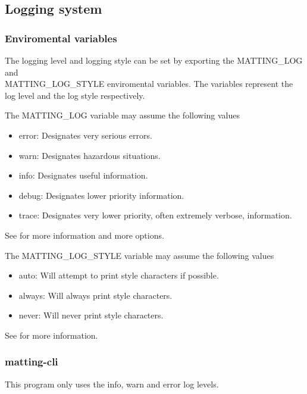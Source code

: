 \documentclass[a4paper]{article}
\begin{document}
\subsection{Logging system}

\subsubsection{Enviromental variables}

The logging level and logging style can be set
by exporting the \colorbox{gray!10}{MATTING\_LOG} and \\
\colorbox{gray!10}{MATTING\_LOG\_STYLE}
enviromental variables. The variables represent the log level
and the log style respectively.

The \colorbox{gray!10}{MATTING\_LOG} variable may assume the following values
\begin{itemize}
    \item \colorbox{gray!10}{error}: Designates very serious errors.
    \item \colorbox{gray!10}{warn}: Designates hazardous situations.
    \item \colorbox{gray!10}{info}: Designates useful information.
    \item \colorbox{gray!10}{debug}: Designates lower priority information.
    \item \colorbox{gray!10}{trace}: Designates very lower priority, often extremely verbose, information.
\end{itemize}
See \cite{envlogginglvl} for more information and more options.

The \colorbox{gray!10}{MATTING\_LOG\_STYLE} variable may assume the following values
\begin{itemize}
    \item \colorbox{gray!10}{auto}: Will attempt to print style characters if possible.
    \item \colorbox{gray!10}{always}: Will always print style characters.
    \item \colorbox{gray!10}{never}: Will never print style characters.
\end{itemize}
See \cite{envloggingstyle} for more information.

\subsubsection{matting-cli}

This program only uses the \colorbox{gray!10}{info}, \colorbox{gray!10}{warn}
and \colorbox{gray!10}{error} log levels.
\end{document}
